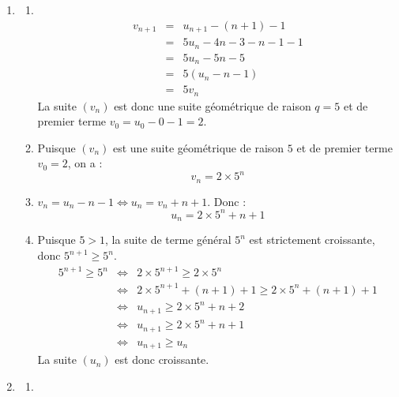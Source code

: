 \documentclass[10pt]{article}
\begin{document}
\begin{enumerate}
\begin{enumerate}
\emph{Conclusion} : la proposition $P_n$ est vérifiée au rang $n = 0$ et est héréditaire, donc, d'après le principe de récurrence, elle est vraie pour tout entier naturel $n$ : $u_n \geqslant n + 1$.
		\item On a : $\lim\limits_{n \to +\infty}(n+1) = +\infty$. Puisque $u_n \geqslant n+1$, par comparaison, on a :
		\[\boxed{\lim_{n \to +\infty}u_n = +\infty}\]
	\end{enumerate}
	\item
    \begin{enumerate}
		\item\
		\begin{eqnarray*}
			v_{n+1} &=& u_{n+1}-(n+1) - 1\\
			&=& 5u_n - 4n - 3 - n - 1 - 1\\
			&=& 5u_n - 5n - 5\\
			&=& 5\left(u_n - n - 1\right)\\
			&=& 5v_n
		\end{eqnarray*}
La suite $\left(v_n\right)$ est donc une suite géométrique de raison $q=5$ et de premier terme $v_0 = u_0 - 0 - 1 = 2$.
		\item Puisque $\left(v_n\right)$ est une suite géométrique de raison $5$ et de premier terme $v_0=2$, on a :
		\[\boxed{v_n = 2 \times 5^n}\]
		\item $v_n = u_n - n - 1 \iff u_n = v_n + n + 1$. Donc :
		\[\boxed{u_n = 2 \times 5^n + n + 1}\]
		\item  Puisque $5 > 1$, la suite de terme général $5^n$ est strictement croissante, donc $5^{n+1} \geqslant 5^n$.
		\begin{eqnarray*}
			5^{n+1} \geqslant 5^n &\iff& 2 \times 5^{n+1} \geqslant 2 \times 5^n\\
			&\iff& 2\times 5^{n+1} + (n+1) + 1 \geqslant 2 \times 5^n + (n + 1) + 1\\
			&\iff& u_{n+1} \geqslant 2 \times 5^n + n + 2\\
			&\iff& u_{n+1} \geqslant 2 \times 5^n + n + 1\\
			&\iff& u_{n+1} \geqslant u_n
		\end{eqnarray*}
		La suite $\left(u_n\right)$ est donc croissante.
	\end{enumerate}
	\item
	\begin{enumerate}
		\item\
		

\end{enumerate}
\end{enumerate}
\end{document}
